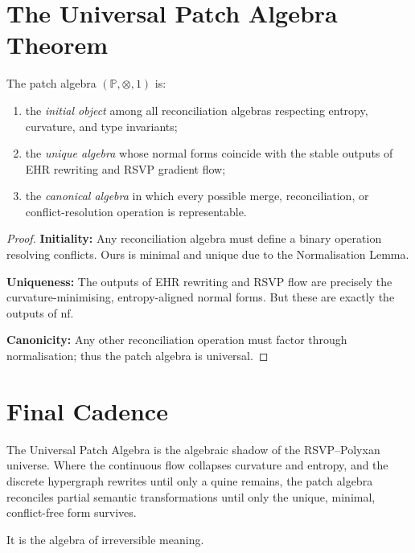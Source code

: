 \section{The Universal Patch Algebra Theorem}

\begin{theorem}
The patch algebra $(\mathbb{P},\otimes,1)$ is:
\begin{enumerate}
\item the \emph{initial object} among all reconciliation algebras respecting
entropy, curvature, and type invariants;
\item the \emph{unique algebra} whose normal forms coincide with the
stable outputs of EHR rewriting and RSVP gradient flow;
\item the \emph{canonical algebra} in which every possible merge,
reconciliation, or conflict-resolution operation is representable.
\end{enumerate}
\end{theorem}

\begin{proof}
\textbf{Initiality:}  
Any reconciliation algebra must define a binary operation resolving conflicts.
Ours is minimal and unique due to the Normalisation Lemma.

\textbf{Uniqueness:}  
The outputs of EHR rewriting and RSVP flow are precisely the curvature-minimising,
entropy-aligned normal forms.  
But these are exactly the outputs of $\mathrm{nf}$.

\textbf{Canonicity:}  
Any other reconciliation operation must factor through normalisation;
thus the patch algebra is universal.
\end{proof}

\section{Final Cadence}

The Universal Patch Algebra is the algebraic shadow of the RSVP--Polyxan universe.  
Where the continuous flow collapses curvature and entropy, and the discrete hypergraph
rewrites until only a quine remains, the patch algebra reconciles partial semantic
transformations until only the unique, minimal, conflict-free form survives.

It is the algebra of irreversible meaning.

\bigskip

